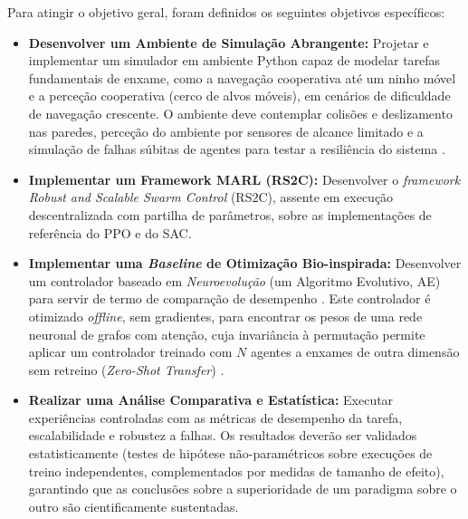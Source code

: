 \documentclass[12pt,reqno, twoside]{amsbook}
\theoremstyle{plain}
\numberwithin{equation}{chapter}
\numberwithin{section}{chapter}
\numberwithin{table}{chapter}
\numberwithin{figure}{chapter}
\begin{document}
Para atingir o objetivo geral, foram definidos os seguintes objetivos específicos:
\begin{itemize}
    \item \textbf{Desenvolver um Ambiente de Simulação Abrangente:} Projetar e implementar um simulador em ambiente Python capaz de modelar tarefas fundamentais de enxame, como a navegação cooperativa até um ninho móvel e a perceção cooperativa (cerco de alvos móveis), em cenários de dificuldade de navegação crescente. O ambiente deve contemplar colisões e deslizamento nas paredes, perceção do ambiente por sensores de alcance limitado e a simulação de falhas súbitas de agentes para testar a resiliência do sistema \cite{pina2024self}.
    \item \textbf{Implementar um Framework MARL (RS2C):} Desenvolver o \textit{framework} \textit{Robust and Scalable Swarm Control} (RS2C), assente em execução descentralizada com partilha de parâmetros, sobre as implementações de referência do PPO e do SAC.
    \item \textbf{Implementar uma \textit{Baseline} de Otimização Bio-inspirada:} Desenvolver um controlador baseado em \emph{Neuroevolução} (um Algoritmo Evolutivo, AE) para servir de termo de comparação de desempenho \cite{such2017deep, salimans2017es}. Este controlador é otimizado \textit{offline}, sem gradientes, para encontrar os pesos de uma rede neuronal de grafos com atenção, cuja invariância à permutação permite aplicar um controlador treinado com $N$ agentes a enxames de outra dimensão sem retreino (\textit{Zero-Shot Transfer}) \cite{chen2024graph}.
    \item \textbf{Realizar uma Análise Comparativa e Estatística:} Executar experiências controladas com as métricas de desempenho da tarefa, escalabilidade e robustez a falhas. Os resultados deverão ser validados estatisticamente (testes de hipótese não-paramétricos sobre execuções de treino independentes, complementados por medidas de tamanho de efeito), garantindo que as conclusões sobre a superioridade de um paradigma sobre o outro são cientificamente sustentadas.
\end{itemize}
\end{document}
